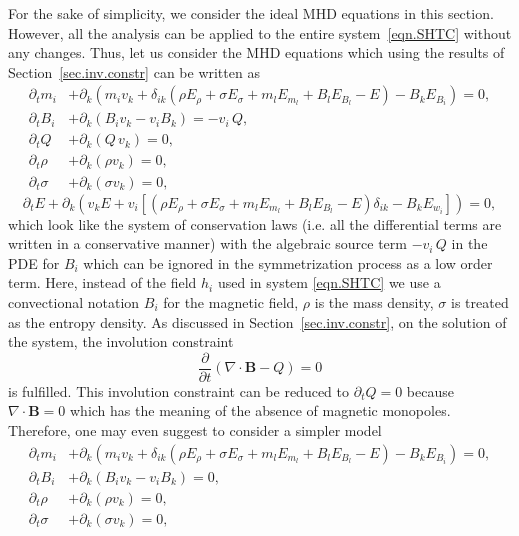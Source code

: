 \documentclass[twoside]{article}
\newcommand{\BB}{{\boldsymbol{B}}}
\newcommand{\ted}{E} %
\newcommand{\pd}{\partial}
\begin{document}
For the sake of simplicity, we consider the ideal MHD equations in this 
section. However, all the analysis can be applied to the entire 
system~\eqref{eqn.SHTC} without any changes. Thus, let us consider the MHD 
equations which using the results of 
Section~\ref{sec.inv.constr} can be written as
\begin{subequations}\label{eqn.heat.cons}
	\begin{align}
\pd_t m_i  & + \pd _k \left (m_i v_k + \delta_{ik} \left( \rho \ted_\rho  + 
\sigma \ted_\sigma 	+ m_l\ted_{m_l} + B_l\ted_{B_l} - \ted \right) - 
B_k\ted_{B_i} \right ) = 
0,\label{eqn.heat.cons.m}\\[1mm]
\pd_t B_i  & + \pd_k \left( B_i v_k - v_i B_k \right) = - v_i\, 
Q,\label{eqn.heat.cons.B}\\[1mm]
\pd_t Q    & + \pd_k(Q\,v_k) = 0,\label{eqn.heat.cons.Q}\\[1mm]
\pd_t \rho & +\pd_k (\rho v_k ) = 0,\label{eqn.heat.cons.rho}\\[1mm]
\pd_t \sigma & +\pd_k (\sigma v_k ) = 0,\label{eqn.heat.cons.s}
	\end{align}
\end{subequations}
\begin{equation}\label{eqn.heat.energy}
\pd_t E + \pd_k \left( v_k \ted 
+ v_i 
\left[ \left ( \rho \ted_\rho  + \sigma\ted_\sigma + m_l\ted_{m_l} + 
B_l\ted_{B_l} - \ted\right 
) \delta_{ik} - B_k\ted_{w_i} \right] \right)=0, 
\end{equation}
which look like the system of conservation laws (i.e. all the differential 
terms are written in a conservative manner) with the algebraic source term $ 
-v_i\, Q $ in the PDE for $ B_i $ which can be ignored in 
the symmetrization process as a low order term. Here,  
instead of the field $ 
h_i $ used in system \eqref{eqn.SHTC} we use a convectional notation $ B_i $ 
for the 
magnetic field, $ \rho $ is the mass density, $ \sigma $ is treated as the 
entropy density. As discussed in Section~\ref{sec.inv.constr}, on the solution 
of the system, the involution constraint 
\begin{equation}
\frac{\pd}{\pd t}\left( \nabla\cdot\BB - Q \right) = 0
\end{equation}
is fulfilled. This involution constraint can be reduced to $ \pd_t Q = 0 $  
because $ \nabla\cdot\BB = 0$ which has the meaning of the absence of magnetic  
monopoles. Therefore, one may even suggest to consider a 
simpler model
\begin{subequations}\label{eqn.heat.cons0}
	\begin{align}
\pd_t m_i  & + \pd _k \left (m_i v_k + \delta_{ik} \left( \rho \ted_\rho  + 
\sigma \ted_\sigma 	+ m_l\ted_{m_l} + B_l\ted_{B_l} - \ted \right) - 
B_k\ted_{B_i} \right ) = 
0,\label{eqn.heat.cons0.m}\\[1mm]
\pd_t B_i  & + \pd_k \left( B_i v_k - v_i B_k \right) = 
0,\label{eqn.heat.cons0.B}\\[1mm]
\pd_t \rho & +\pd_k (\rho v_k ) = 0,\label{eqn.heat.cons0.rho}\\[1mm]
\pd_t \sigma & +\pd_k (\sigma v_k ) = 0,\label{eqn.heat.cons0.s}
	\end{align}
\end{subequations}
\end{document}
